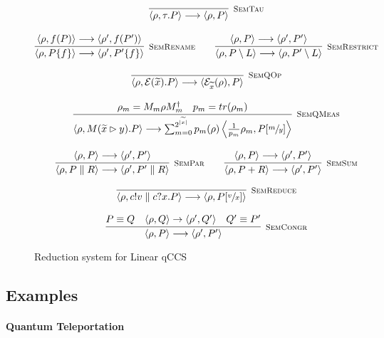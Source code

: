 \begin{figure}[h!]
  \begin{gather*}
    \infer[\mbox{\footnotesize\scshape SemTau}]{\langle \rho, \tau . P \rangle \longrightarrow \langle \rho, P \rangle}{} \\[0.3cm]
    \infer[\mbox{\footnotesize\scshape SemRename}]{\langle \rho, P \{f\} \rangle \longrightarrow \langle \rho', P' \{f\}\rangle}{\langle \rho, f(P) \rangle \longrightarrow \langle \rho', f(P') \rangle} \qquad
    \infer[\mbox{\footnotesize\scshape SemRestrict}]{\langle \rho, P \setminus L \rangle \longrightarrow \langle \rho, P' \setminus L \rangle}{\langle \rho, P \rangle \longrightarrow \langle \rho', P' \rangle} \\[0.3cm]
    \infer[\mbox{\footnotesize\scshape SemQOp}]{\langle \rho, \mathcal{E}(\widetilde{x}) . P \rangle \longrightarrow \langle \mathcal{E}_{\widetilde{x}}(\rho), P \rangle}{} \\[0.3cm]
    \infer[\mbox{\footnotesize\scshape SemQMeas}]{\langle \rho, M(\widetilde{x} \rhd y) . P \rangle \longrightarrow \sum_{m = 0}^{2^{|\widetilde{x}|}} p_m(\rho) \left\langle \frac{1}{p_m}\rho_m , P[\sfrac{m}{y}] \right\rangle}{\rho_m = M_m \rho M_m^\dag & p_m = tr(\rho_m)} \\[0.3cm]
    \infer[\mbox{\footnotesize\scshape SemPar}]{\langle \rho, P \parallel R \rangle \longrightarrow \langle \rho', P' \parallel R \rangle}{\langle \rho, P \rangle \longrightarrow \langle \rho', P' \rangle} \qquad
    \infer[\mbox{\footnotesize\scshape SemSum}]{\langle \rho, P + R \rangle \longrightarrow \langle \rho', P' \rangle}{\langle \rho, P \rangle \longrightarrow \langle \rho', P' \rangle} \\[0.3cm]
    \infer[\mbox{\footnotesize\scshape SemReduce}]{\langle \rho, c!v \parallel c?x . P \rangle \longrightarrow \langle \rho, P[\sfrac{v}{x}] \rangle}{} \\[0.3cm]
    \infer[\mbox{\footnotesize\scshape SemCongr}]{\langle \rho, P \rangle \longrightarrow \langle \rho', P' \rangle}
    {P \equiv Q & \confw{\rho, Q} \rightarrow \confw{\rho', Q'} & Q' \equiv P'}
  \end{gather*}
\caption{Reduction system for Linear qCCS}
\label{reduction}
\end{figure}
  
\subsection{Examples}
  \paragraph{Quantum Teleportation}


